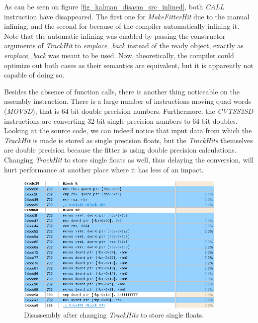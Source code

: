 \documentclass[12pt]{article}
\begin{document}
As can be seen on figure \ref{fig_kalman_disasm_src_inlined}, both \textit{CALL} instruction have disappeared. The first one for \textit{MakeFitterHit} due to the manual inlining, and the second for  because of the compiler automatically inlining it. Note that the automatic inlining was enabled by passing the constructor arguments of \textit{TrackHit} to \textit{emplace\_back} instead of the ready object, exactly as \textit{emplace\_back} was meant to be used. Now, theoretically, the compiler could optimize out both cases as their semantics are equivalent, but it is apparently not capable of doing so.

Besides the absence of function calls, there is another thing noticeable on the assembly instruction. There is a large number of instructions moving quad words (\textit{MOVSD}), that is 64 bit double precision numbers. Furthermore, the \textit{CVTSS2SD} instructions are converting 32 bit single precision numbers to 64 bit doubles. Looking at the source code, we can indeed notice that input data from which the \textit{TrackHit} is made is stored as single precision floats, but the \textit{TrackHits} themselves are double precision because the fitter is using double precision calculations. Changing \textit{TrackHit} to store single floats as well, thus delaying the conversion, will hurt performance at another place where it has less of an impact.

\begin{figure}[H]
	\begin{center}
		\includegraphics[width=0.9\textwidth]{kalmanfit_disasm_opt_asm_nocvt}
	\end{center}
	\caption{Disassembly after changing \textit{TrackHits} to store single floats.}
	\label{fig_kalman_disasm_src_nocvt}
\end{figure}
\end{document}

